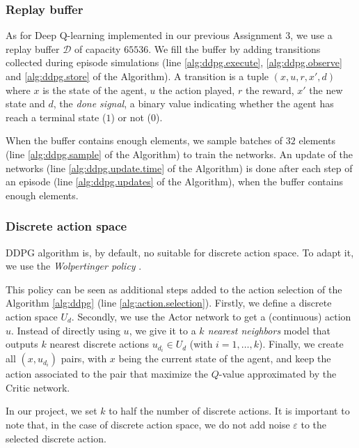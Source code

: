 \documentclass[a4paper, 12pt]{article}
\begin{document}
    \subsubsection{Replay buffer}
    
    As for Deep Q-learning implemented in our previous Assignment 3, we use a replay buffer $\mathcal{D}$ of capacity $\num{65536}$. We fill the buffer by adding transitions collected during episode simulations (line \ref{alg:ddpg.execute}, \ref{alg:ddpg.observe} and \ref{alg:ddpg.store} of the Algorithm). A transition is a tuple $(x, u, r, x', d)$ where $x$ is the state of the agent, $u$ the action played, $r$ the reward, $x'$ the new state and $d$, the \emph{done signal}, a binary value indicating whether the agent has reach a terminal state ($1$) or not ($0$).
    
    When the buffer contains enough elements, we sample batches of $\num{32}$ elements (line \ref{alg:ddpg.sample} of the Algorithm) to train the networks. An update of the networks (line \ref{alg:ddpg.update.time} of the Algorithm) is done after each step of an episode (line \ref{alg:ddpg.updates} of the Algorithm), when the buffer contains enough elements.
    
    \subsubsection{Discrete action space}
    
    DDPG algorithm is, by default, no suitable for discrete action space. To adapt it, we use the \emph{Wolpertinger policy} \cite{dulac2015deep}.
    
    This policy can be seen as additional steps added to the action selection of the Algorithm \ref{alg:ddpg} (line \ref{alg:action.selection}). Firstly, we define a discrete action space $U_d$. Secondly, we use the Actor network to get a (continuous) action $u$. Instead of directly using $u$, we give it to a \emph{$k$ nearest neighbors} model that outputs $k$ nearest discrete actions $u_{d_i} \in U_d$ (with $i = 1, \dots, k$). Finally, we create all $(x, u_{d_i})$ pairs, with $x$ being the current state of the agent, and keep the action associated to the pair that maximize the $Q$-value approximated by the Critic network.
    
    In our project, we set $k$ to half the number of discrete actions. It is important to note that, in the case of discrete action space, we do not add noise $\varepsilon$ to the selected discrete action.
    
\end{document}
